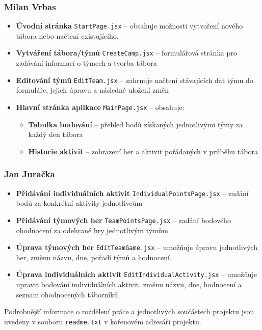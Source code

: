 \documentclass[a4paper, 12pt]{article} %
\begin{document}
\subsubsection*{Milan Vrbas}
\begin{itemize}
    \item \textbf{Úvodní stránka} \texttt{StartPage.jsx} -- obsahuje možnosti vytvoření nového 
        tábora nebo načtení existujícího.
    \item \textbf{Vytváření tábora/týmů} \texttt{CreateCamp.jsx} -- formulářová stránka pro 
        zadávání informací o týmech a tvorba tábora
    \item \textbf{Editování týmů} \texttt{EditTeam.jsx} -- zahrnuje načtení stávajících dat 
        týmu do formuláře, jejich úpravu a následné uložení změn
    \item \textbf{Hlavní stránka aplikace} \texttt{MainPage.jsx} -- obsahuje:
    \begin{itemize}
        \item \textbf{Tabulka bodování} -- přehled bodů získaných jednotlivými týmy za každý 
            den tábora
        \item \textbf{Historie aktivit} -- zobrazení her a aktivit pořádaných v průběhu tábora
    \end{itemize}
\end{itemize}

\subsubsection*{Jan Juračka}
\begin{itemize}
    \item \textbf{Přidávání individuálních aktivit} \texttt{IndividualPointsPage.jsx} -- 
        zadání bodů za konkrétní aktivity jednotlivcům
    \item \textbf{Přidávání týmových her} \texttt{TeamPointsPage.jsx} -- zadání bodového 
        ohodnocení za odehrané hry jednotlivým týmům
    \item \textbf{Úprava týmových her} \texttt{EditTeamGame.jsx} -- umožňuje úpravu jednotlivých her, změnu názvu, dne, pořadí týmů a hodnocení.
    \item \textbf{Úprava individuálních aktivit} \texttt{EditIndividualActivity.jsx} -- umožňuje upravit bodování individuálních aktivit, změnu názvu, dne, hodnocení a seznam ohodnocených táborníků.
\end{itemize}
Podrobnější informace o rozdělení práce a jednotlivých součástech projektu jsou uvedeny v 
souboru \texttt{readme.txt} v kořenovém adresáři projektu.
\end{document}
